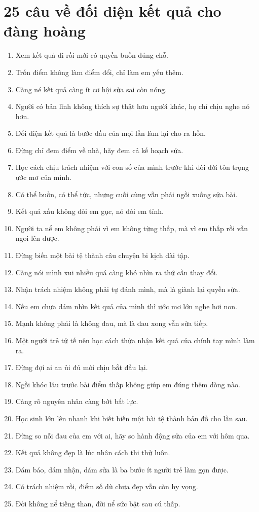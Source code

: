 \section{25 câu về đối diện kết quả cho đàng hoàng}
\begin{enumerate}[leftmargin=*,resume]
\item Xem kết quả đi rồi mới có quyền buồn đúng chỗ.
\item Trốn điểm không làm điểm đổi, chỉ làm em yếu thêm.
\item Càng né kết quả càng ít cơ hội sửa sai còn nóng.
\item Người có bản lĩnh không thích sự thật hơn người khác, họ chỉ chịu nghe nó hơn.
\item Đối diện kết quả là bước đầu của mọi lần làm lại cho ra hồn.
\item Đừng chỉ đem điểm về nhà, hãy đem cả kế hoạch sửa.
\item Học cách chịu trách nhiệm với con số của mình trước khi đòi đời tôn trọng ước mơ của mình.
\item Có thể buồn, có thể tức, nhưng cuối cùng vẫn phải ngồi xuống sửa bài.
\item Kết quả xấu không đòi em gục, nó đòi em tỉnh.
\item Người ta nể em không phải vì em không từng thấp, mà vì em thấp rồi vẫn ngoi lên được.
\item Đừng biến một bài tệ thành câu chuyện bi kịch dài tập.
\item Càng nói mình xui nhiều quá càng khó nhìn ra thứ cần thay đổi.
\item Nhận trách nhiệm không phải tự đánh mình, mà là giành lại quyền sửa.
\item Nếu em chưa dám nhìn kết quả của mình thì ước mơ lớn nghe hơi non.
\item Mạnh không phải là không đau, mà là đau xong vẫn sửa tiếp.
\item Một người trẻ tử tế nên học cách thừa nhận kết quả của chính tay mình làm ra.
\item Đừng đợi ai an ủi đủ mới chịu bắt đầu lại.
\item Ngồi khóc lâu trước bài điểm thấp không giúp em đúng thêm dòng nào.
\item Càng rõ nguyên nhân càng bớt bất lực.
\item Học sinh lớn lên nhanh khi biết biến một bài tệ thành bản đồ cho lần sau.
\item Đừng so nỗi đau của em với ai, hãy so hành động sửa của em với hôm qua.
\item Kết quả không đẹp là lúc nhân cách thi thử luôn.
\item Dám báo, dám nhận, dám sửa là ba bước ít người trẻ làm gọn được.
\item Có trách nhiệm rồi, điểm số dù chưa đẹp vẫn còn hy vọng.
\item Đời không nể tiếng than, đời nể sức bật sau cú thấp.
\end{enumerate}

